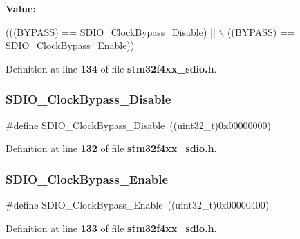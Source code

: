 {\bfseries Value\+:}
\begin{DoxyCode}
(((BYPASS) == SDIO_ClockBypass_Disable) || \(\backslash\)
                                     ((BYPASS) == SDIO_ClockBypass_Enable))
\end{DoxyCode}


Definition at line \textbf{ 134} of file \textbf{ stm32f4xx\+\_\+sdio.\+h}.

\mbox{\label{group__SDIO__Clock__Bypass_gacc168d55136a0c6575e5afd7a6550343}} 
\subsubsection{S\+D\+I\+O\+\_\+\+Clock\+Bypass\+\_\+\+Disable}
{\footnotesize\ttfamily \#define S\+D\+I\+O\+\_\+\+Clock\+Bypass\+\_\+\+Disable~((uint32\+\_\+t)0x00000000)}



Definition at line \textbf{ 132} of file \textbf{ stm32f4xx\+\_\+sdio.\+h}.

\mbox{\label{group__SDIO__Clock__Bypass_ga5e1e9f7e05ea62dd2315eb556bc10e5c}} 
\subsubsection{S\+D\+I\+O\+\_\+\+Clock\+Bypass\+\_\+\+Enable}
{\footnotesize\ttfamily \#define S\+D\+I\+O\+\_\+\+Clock\+Bypass\+\_\+\+Enable~((uint32\+\_\+t)0x00000400)}



Definition at line \textbf{ 133} of file \textbf{ stm32f4xx\+\_\+sdio.\+h}.

